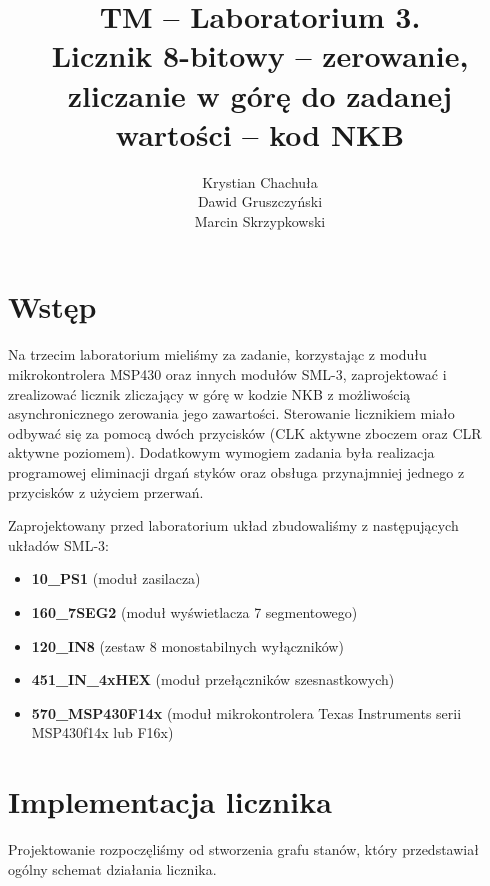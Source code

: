 \documentclass[fleqn]{article}
\title{TM -- Laboratorium 3. \\ \large Licznik 8-bitowy – zerowanie, zliczanie w górę do zadanej wartości – kod NKB}
\author{Krystian Chachuła \\ Dawid Gruszczyński \\ Marcin Skrzypkowski}
\begin{document}
\maketitle

\setcounter{page}{0}
\thispagestyle{empty}

\pagebreak

\setcounter{page}{1}

\section{Wstęp}

Na trzecim laboratorium mieliśmy za zadanie, korzystając z modułu mikrokontrolera MSP430 oraz innych modułów SML-3, zaprojektować i zrealizować licznik zliczający w górę w kodzie NKB z możliwością asynchronicznego zerowania jego zawartości.
Sterowanie licznikiem miało odbywać się za pomocą dwóch przycisków (CLK aktywne zboczem oraz CLR aktywne poziomem).
Dodatkowym wymogiem zadania była realizacja programowej eliminacji drgań styków oraz obsługa przynajmniej jednego z przycisków z użyciem przerwań.

Zaprojektowany przed laboratorium układ zbudowaliśmy z następujących układów SML-3:

\begin{itemize}
	\item \textbf{10\_PS1} (moduł zasilacza)
	\item \textbf{160\_7SEG2} (moduł wyświetlacza 7 segmentowego)
	\item \textbf{120\_IN8} (zestaw 8 monostabilnych wyłączników)
	\item \textbf{451\_IN\_4xHEX} (moduł przełączników szesnastkowych)
	\item \textbf{570\_MSP430F14x} (moduł mikrokontrolera Texas Instruments serii MSP430f14x lub F16x)
\end{itemize}

\section{Implementacja licznika}

Projektowanie rozpoczęliśmy od stworzenia grafu stanów, który przedstawiał ogólny schemat działania licznika.

\end{document}
